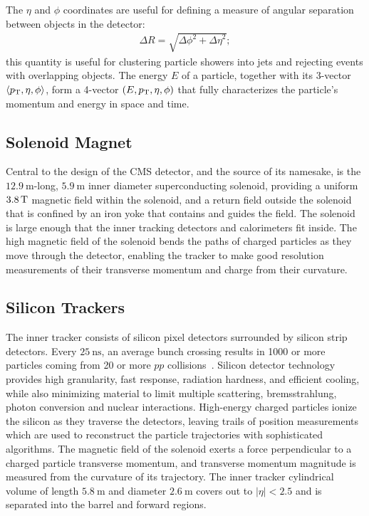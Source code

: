 The $\eta$ and $\phi$ coordinates are useful for defining a measure of angular separation between objects in the detector:
\begin{align}
\Delta R = \sqrt {{\Delta \phi}^2+{\Delta \eta}^2};
\end{align}
this quantity is useful for clustering particle showers into jets and rejecting events with overlapping objects.
The energy $E$ of a particle, together with its 3-vector $\langle p_{\mathrm{T}}, \eta, \phi \rangle$, form a 4-vector $(E,p_{\mathrm{T}}, \eta, \phi)$ that fully characterizes the particle's momentum and energy in space and time.

\subsection{Solenoid Magnet}
Central to the design of the CMS detector, and the source of its namesake, is the $\SI{12.9}{\m}$-long, $\SI{5.9}{\m}$ inner diameter superconducting solenoid, providing a uniform $\SI{3.8}{\T}$ magnetic field within the solenoid, and a return field outside the solenoid that is confined by an iron yoke that contains and guides the field.
The solenoid is large enough that the inner tracking detectors and calorimeters fit inside.
The high magnetic field of the solenoid bends the paths of charged particles as they move through the detector, enabling the tracker to make good resolution measurements of their transverse momentum and charge from their curvature.

\subsection{Silicon Trackers}
The inner tracker consists of silicon pixel detectors surrounded by silicon strip detectors.
Every $\SI{25}{\ns}$, an average bunch crossing results in 1000 or more particles coming from 20 or more $pp$ collisions~\cite{Chatrchyan:1129810}.
Silicon detector technology provides high granularity, fast response, radiation hardness, and efficient cooling, while also minimizing material to limit multiple scattering, bremsstrahlung, photon conversion and nuclear interactions.
High-energy charged particles ionize the silicon as they traverse the detectors, leaving trails of position measurements which are used to reconstruct the particle trajectories with sophisticated algorithms.
The magnetic field of the solenoid exerts a force perpendicular to a charged particle transverse momentum, and transverse momentum magnitude is measured from the curvature of its trajectory.
The inner tracker cylindrical volume of length $\SI{5.8}{\m}$ and diameter $\SI{2.6}{\m}$ covers out to $\vert \eta \vert < 2.5$ and is separated into the barrel and forward regions.

